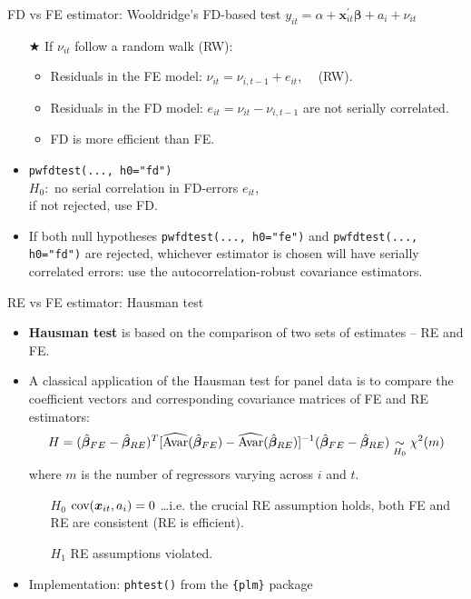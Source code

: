 \documentclass[usenames,dvipsnames]{beamer}
\begin{document}
\begin{frame}{FD vs FE estimator: Wooldridge's FD-based test}
\small
$y_{it} = \alpha + \bm{x}^{\prime}_{it} \bm{\beta} + a_i + \nu_{it}$\\ \medskip
\begin{itemize}
    \item[$\bigstar$] If $\nu_{it}$ follow a random walk (RW): 
    \begin{itemize}

          \item Residuals in the FE model: $\nu_{it}=\nu_{i,t-1}+e_{it}$, ~~(RW).
          \item Residuals in the FD model: $e_{it} = \nu_{it}-\nu_{i,t-1}$ are not serially correlated.
          \item FD is more efficient than FE.
        \end{itemize}
        \smallskip
        \item \texttt{pwfdtest(..., h0="fd")} \\
        $H_0:$ no serial correlation in FD-errors $e_{it}$, \\if not rejected, use FD.
        \smallskip
        \item If both null hypotheses \texttt{pwfdtest(..., h0="fe")} and \texttt{pwfdtest(..., h0="fd")} are rejected, whichever estimator is chosen will have serially correlated errors: use the autocorrelation-robust covariance estimators.
    \smallskip
\end{itemize}
\end{frame}
\begin{frame}{RE vs FE estimator: Hausman test}
\small
\begin{itemize}

    \item \textbf{Hausman test} is based on the comparison of two sets of estimates -- RE and FE.
    \bigskip
    \item A classical application of the Hausman test for panel data is to compare the coefficient vectors and corresponding covariance matrices of FE and RE estimators:
    $$H=(\hat{\bm{\beta}}_{FE} - \hat{\bm{\beta}}_{RE})^T [\widehat{\textnormal{Avar}}(\hat{\bm{\beta}}_{FE}) - \widehat{\textnormal{Avar}}(\hat{\bm{\beta}}_{RE})]^{-1} (\hat{\bm{\beta}}_{FE} - \hat{\bm{\beta}}_{RE}) \underset{H_0}{\sim} \chi^2(m)$$
    where $m$ is the number of regressors varying across $i$ and $t$.
    \smallskip
    \begin{itemize}
    \item[$H_0$] $\textnormal{cov}(\bm{x}_{it},a_i) = 0$ \dots i.e. the crucial RE assumption holds, both FE and RE are consistent (RE is efficient). \\ \smallskip
    \item[$H_1$] RE assumptions violated.
    \end{itemize}
    \medskip
    \item Implementation: \texttt{phtest()} from the \texttt{\{plm\}} package

\end{itemize}
\end{frame}
\end{document}
